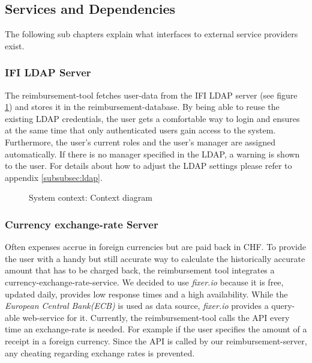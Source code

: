 \subsection{Services and Dependencies}
The following sub chapters explain what interfaces to external service providers exist.

\subsubsection{IFI LDAP Server}
The reimbursement-tool fetches user-data from the IFI LDAP server (see figure \ref{fig:context-diagram}) and stores it in the reimbursement-database. By being able to reuse the existing LDAP credentials, the user gets a comfortable way to login and ensures at the same time that only authenticated users gain access to the system. Furthermore, the user's current roles and the user's manager are assigned automatically. If there is no manager specified in the LDAP, a warning is shown to the user. For details about how to adjust the LDAP settings please refer to appendix \ref{subsubsec:ldap}.

\begin{figure}[H]
	\centering
	\caption{System context: Context diagram}
	\label{fig:context-diagram}
\end{figure}

\subsubsection{Currency exchange-rate Server}
Often expenses accrue in foreign currencies but are paid back in CHF. To provide the user with a handy but still accurate way to calculate the historically accurate amount that has to be charged back, the reimbursement tool integrates a currency-exchange-rate-service. We decided to use \textit{fixer.io} \cite{fixer} because it is free, updated daily, provides low response times and a high availability. While the \textit{European Central Bank(ECB)}\cite{ecb} is used as data source, \textit{fixer.io} provides a query-able web-service for it. Currently, the reimbursement-tool calls the API every time an exchange-rate is needed. For example if the user specifies the amount of a receipt in a foreign currency. Since the API is called by our reimbursement-server, any cheating regarding exchange rates is prevented.

